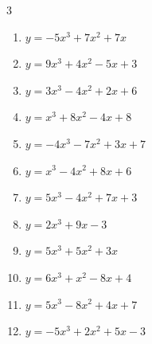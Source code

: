 \begin{multicols}{3}
\begin{enumerate}

  \item $y=-5x^{3}+7x^{2}+7x$


  \item $y=9x^{3}+4x^{2}-5x+3$


  \item $y=3x^{3}-4x^{2}+2x+6$


  \item $y=x^{3}+8x^{2}-4x+8$


  \item $y=-4x^{3}-7x^{2}+3x+7$


  \item $y=x^{3}-4x^{2}+8x+6$


  \item $y=5x^{3}-4x^{2}+7x+3$


  \item $y=2x^{3}+9x-3$


  \item $y=5x^{3}+5x^{2}+3x$


  \item $y=6x^{3}+x^{2}-8x+4$


  \item $y=5x^{3}-8x^{2}+4x+7$


\columnbreak %

  \item $y=-5x^{3}+2x^{2}+5x-3$



\end{enumerate}
\end{multicols}
